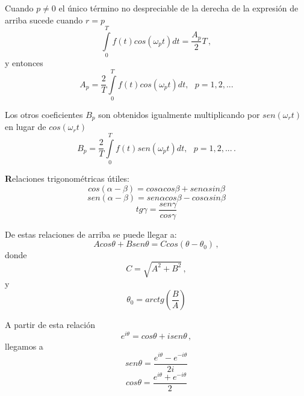 \documentclass[
]{agujournal2019}
\begin{document}
Cuando \(p\ne0\) el único término no despreciable de la derecha de la
expresión de arriba sucede cuando \(r=p\)
\[\int\limits^{T}_{0}f(t)cos(\omega_p t)dt=\frac{A_p}{2}T\,,\] y
entonces
\[A_p=\frac{2}{T}\int\limits_0^{T} f(t) cos(\omega_p t) dt,\,\,\,\,p=1,2,...\]

Los otros coeficientes \(B_p\) son obtenidos igualmente multiplicando
por \(sen(\omega_r t)\) en lugar de \(cos(\omega_r t)\)
\[B_p=\frac{2}{T}\int\limits_0^{T} f(t) sen(\omega_p t) dt,\,\,\,\,p=1,2,...\,.\]

\begin{framed}
{\noindent \textbf Relaciones trigonométricas útiles:}
\\
$$cos(\alpha-\beta)=cos\alpha cos\beta + sen\alpha sin\beta$$
$$sen(\alpha-\beta)=sen\alpha cos\beta - cos\alpha sin\beta$$
$$tg\gamma=\frac{sen\gamma}{cos\gamma}$$

De estas relaciones de arriba se puede llegar a:
$$Acos\theta + Bsen\theta=Ccos(\theta-\theta_0)\,,$$
donde
$$C=\sqrt{A^2 + B^2}\,,$$
y
$$\theta_0=arctg{\left(\frac{B}{A}\right)}$$

A partir de esta relación
$$e^{i\theta}=cos\theta+isen\theta\,,$$
llegamos a
$$sen\theta=\frac{e^{i\theta}-e^{-i\theta}}{2i}$$
$$cos\theta=\frac{e^{i\theta}+e^{-i\theta}}{2}$$
\end{framed}
\end{document}

